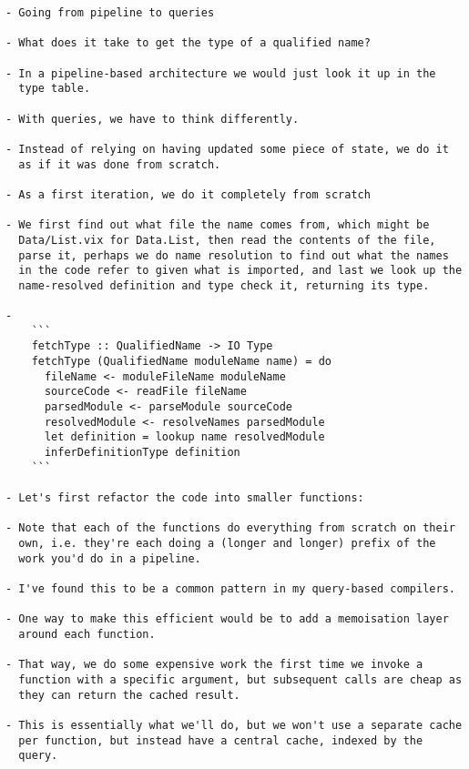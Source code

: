 \documentclass[12pt, a4paper]{report}
\begin{document}
\begin{verbatim}
- Going from pipeline to queries

- What does it take to get the type of a qualified name?

- In a pipeline-based architecture we would just look it up in the
  type table.

- With queries, we have to think differently.

- Instead of relying on having updated some piece of state, we do it
  as if it was done from scratch.

- As a first iteration, we do it completely from scratch

- We first find out what file the name comes from, which might be
  Data/List.vix for Data.List, then read the contents of the file,
  parse it, perhaps we do name resolution to find out what the names
  in the code refer to given what is imported, and last we look up the
  name-resolved definition and type check it, returning its type.

-
	```
	fetchType :: QualifiedName -> IO Type
	fetchType (QualifiedName moduleName name) = do
	  fileName <- moduleFileName moduleName
	  sourceCode <- readFile fileName
	  parsedModule <- parseModule sourceCode
	  resolvedModule <- resolveNames parsedModule
	  let definition = lookup name resolvedModule
	  inferDefinitionType definition
	```

- Let's first refactor the code into smaller functions:

- Note that each of the functions do everything from scratch on their
  own, i.e. they're each doing a (longer and longer) prefix of the
  work you'd do in a pipeline.

- I've found this to be a common pattern in my query-based compilers.

- One way to make this efficient would be to add a memoisation layer
  around each function.

- That way, we do some expensive work the first time we invoke a
  function with a specific argument, but subsequent calls are cheap as
  they can return the cached result.

- This is essentially what we'll do, but we won't use a separate cache
  per function, but instead have a central cache, indexed by the
  query.
\end{verbatim}
\end{document}
